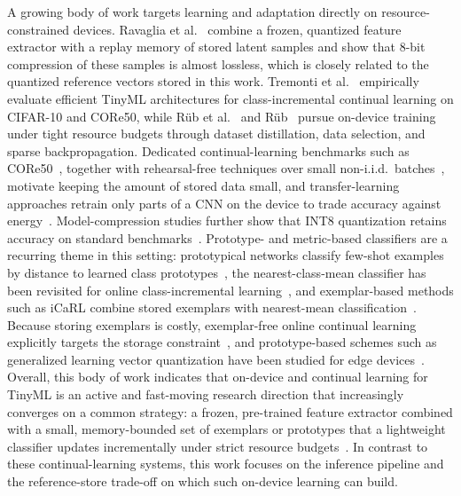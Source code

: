 \documentclass[sigconf,review,nonacm]{acmart}
\begin{document}
A growing body of work targets learning and adaptation directly on resource-constrained devices.
Ravaglia et al.~\cite{ravaglia2021tinyml} combine a frozen, quantized feature extractor with a replay memory of stored latent samples and show that 8-bit compression of these samples is almost lossless, which is closely related to the quantized reference vectors stored in this work.
Tremonti et al.~\cite{tremonti2024empirical} empirically evaluate efficient TinyML architectures for class-incremental continual learning on CIFAR-10 and CORe50, while R{\"u}b et al.~\cite{rueb2024continual} and R{\"u}b~\cite{rueb2025thesis} pursue on-device training under tight resource budgets through dataset distillation, data selection, and sparse backpropagation.
Dedicated continual-learning benchmarks such as CORe50~\cite{lomonaco2017core50}, together with rehearsal-free techniques over small non-i.i.d.\ batches~\cite{lomonaco2020rehearsal}, motivate keeping the amount of stored data small, and transfer-learning approaches retrain only parts of a CNN on the device to trade accuracy against energy~\cite{fragkou2022transfer}.
Model-compression studies further show that INT8 quantization retains accuracy on standard benchmarks~\cite{shabir2025compression}.
Prototype- and metric-based classifiers are a recurring theme in this setting: prototypical networks classify few-shot examples by distance to learned class prototypes~\cite{snell2017prototypical}, the nearest-class-mean classifier has been revisited for online class-incremental learning~\cite{mai2021supervised}, and exemplar-based methods such as iCaRL combine stored exemplars with nearest-mean classification~\cite{rebuffi2017icarl}.
Because storing exemplars is costly, exemplar-free online continual learning explicitly targets the storage constraint~\cite{he2022exemplar}, and prototype-based schemes such as generalized learning vector quantization have been studied for edge devices~\cite{diao2021generalized}.
Overall, this body of work indicates that on-device and continual learning for TinyML is an active and fast-moving research direction that increasingly converges on a common strategy: a frozen, pre-trained feature extractor combined with a small, memory-bounded set of exemplars or prototypes that a lightweight classifier updates incrementally under strict resource budgets~\cite{disabato2020incremental,ravaglia2021tinyml,tremonti2024empirical,rueb2025thesis,mai2021supervised}.
In contrast to these continual-learning systems, this work focuses on the inference pipeline and the reference-store trade-off on which such on-device learning can build.
\end{document}
